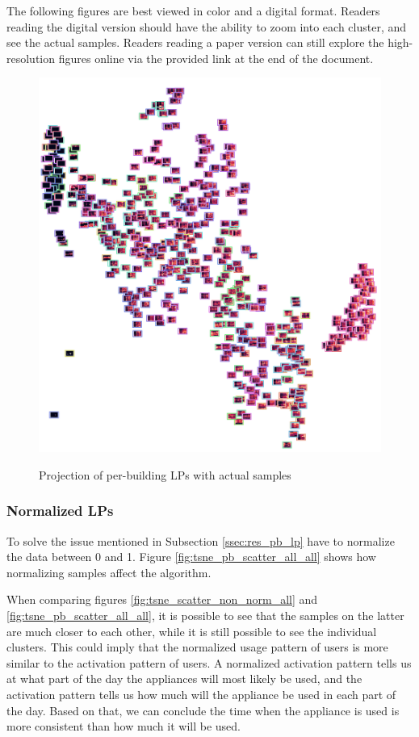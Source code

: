 The following figures are best viewed in color and a digital format. 
Readers reading the digital version should have the ability to zoom into each cluster, and see the actual samples. 
Readers reading a paper version can still explore the high-resolution figures online via the provided link at the end of the document.

\begin{figure}[H]
	\centering
	\caption{Projection of per-building LPs with actual samples}
	\includegraphics[width=.9\textwidth]{Figures/TSNE/TSNE_per_building/non_norm/img_scatter_allall.png}
	\label{fig:tsne_pb_img_scatter_allall}
\end{figure}

\subsubsection{Normalized LPs}

To solve the issue mentioned in Subsection \ref{ssec:res_pb_lp} have to normalize the data between 0 and 1.
Figure \ref{fig:tsne_pb_scatter_all_all} shows how normalizing samples affect the algorithm.

When comparing figures \ref{fig:tsne_scatter_non_norm_all} and \ref{fig:tsne_pb_scatter_all_all},
it is possible to see that the samples on the latter are much closer to each other,
while it is still possible to see the individual clusters.
This could imply that the normalized usage pattern of users is more similar to the activation pattern of users.
A normalized activation pattern tells us at what part of the day the appliances will most likely be used,
and the activation pattern tells us how much will the appliance be used in each part of the day.
Based on that, we can conclude the time when the appliance is used is more consistent than how much it will be used. 


